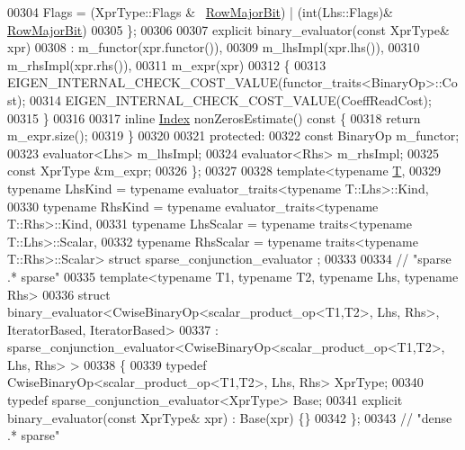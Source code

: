 \begin{DoxyCode}
00304     Flags = (XprType::Flags & ~\hyperlink{group__flags_gae4f56c2a60bbe4bd2e44c5b19cbe8762}{RowMajorBit}) | (\textcolor{keywordtype}{int}(Lhs::Flags)&
      \hyperlink{group__flags_gae4f56c2a60bbe4bd2e44c5b19cbe8762}{RowMajorBit})
00305   \};
00306 
00307   \textcolor{keyword}{explicit} binary\_evaluator(\textcolor{keyword}{const} XprType& xpr)
00308     : m\_functor(xpr.functor()),
00309       m\_lhsImpl(xpr.lhs()),
00310       m\_rhsImpl(xpr.rhs()),
00311       m\_expr(xpr)
00312   \{
00313     EIGEN\_INTERNAL\_CHECK\_COST\_VALUE(functor\_traits<BinaryOp>::Cost);
00314     EIGEN\_INTERNAL\_CHECK\_COST\_VALUE(CoeffReadCost);
00315   \}
00316 
00317   \textcolor{keyword}{inline} \hyperlink{namespace_eigen_a62e77e0933482dafde8fe197d9a2cfde}{Index} nonZerosEstimate()\textcolor{keyword}{ const }\{
00318     \textcolor{keywordflow}{return} m\_expr.size();
00319   \}
00320 
00321 \textcolor{keyword}{protected}:
00322   \textcolor{keyword}{const} BinaryOp m\_functor;
00323   evaluator<Lhs> m\_lhsImpl;
00324   evaluator<Rhs> m\_rhsImpl;
00325   \textcolor{keyword}{const} XprType &m\_expr;
00326 \};
00327 
00328 \textcolor{keyword}{template}<\textcolor{keyword}{typename} \hyperlink{group___sparse_core___module_class_eigen_1_1_triplet}{T},
00329          \textcolor{keyword}{typename} LhsKind   = \textcolor{keyword}{typename} evaluator\_traits<typename T::Lhs>::Kind,
00330          \textcolor{keyword}{typename} RhsKind   = \textcolor{keyword}{typename} evaluator\_traits<typename T::Rhs>::Kind,
00331          \textcolor{keyword}{typename} LhsScalar = \textcolor{keyword}{typename} traits<typename T::Lhs>::Scalar,
00332          \textcolor{keyword}{typename} RhsScalar = \textcolor{keyword}{typename} traits<typename T::Rhs>::Scalar> \textcolor{keyword}{struct }sparse\_conjunction\_evaluator
      ;
00333 
00334 \textcolor{comment}{// "sparse .* sparse"}
00335 \textcolor{keyword}{template}<\textcolor{keyword}{typename} T1, \textcolor{keyword}{typename} T2, \textcolor{keyword}{typename} Lhs, \textcolor{keyword}{typename} Rhs>
00336 \textcolor{keyword}{struct }binary\_evaluator<CwiseBinaryOp<scalar\_product\_op<T1,T2>, Lhs, Rhs>, IteratorBased, IteratorBased>
00337   : sparse\_conjunction\_evaluator<CwiseBinaryOp<scalar\_product\_op<T1,T2>, Lhs, Rhs> >
00338 \{
00339   \textcolor{keyword}{typedef} CwiseBinaryOp<scalar\_product\_op<T1,T2>, Lhs, Rhs> XprType;
00340   \textcolor{keyword}{typedef} sparse\_conjunction\_evaluator<XprType> Base;
00341   \textcolor{keyword}{explicit} binary\_evaluator(\textcolor{keyword}{const} XprType& xpr) : Base(xpr) \{\}
00342 \};
00343 \textcolor{comment}{// "dense .* sparse"}

\end{DoxyCode}
